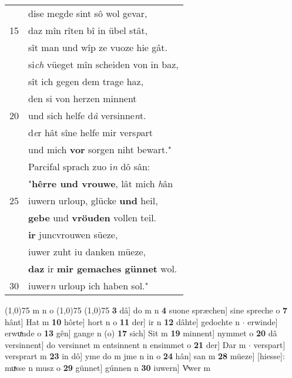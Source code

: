 \documentclass[8pt,a4paper,notitlepage]{article}
\begin{document}
\begin{table}[ht]
\begin{minipage}[t]{0.5\linewidth}
\begin{tabular}{rl}
 & dise megde sint sô wol gevar,\\ 
15 & daz mîn rîten bî in übel stât,\\ 
 & sît man und wîp ze vuoze hie gât.\\ 
 & si\textit{ch} vüeget mîn scheiden von in baz,\\ 
 & sît ich gegen dem trage haz,\\ 
 & den si von herzen minnent\\ 
20 & und sich helfe d\textit{â} versinne\textit{n}t.\\ 
 & d\textit{e}r hât sîne helfe mir vers\textit{p}art\\ 
 & und mich \textbf{vor} sorgen niht bewart."\\ 
 & Parcifal sprach zuo i\textit{n} dô sân:\\ 
 & "\textbf{hêrre und vrouwe}, lât mich \textit{h}ân\\ 
25 & iuwern urloup, glücke \textbf{und} heil,\\ 
 & \textbf{gebe} und \textbf{vröuden} vollen teil.\\ 
 & \textbf{ir} juncvrouwen süeze,\\ 
 & iuwer zuht iu danken müeze,\\ 
 & \textbf{daz} ir \textbf{mir gemaches günnet} wol.\\ 
30 & iuwer\textit{n} urloup ich haben sol."\\ 
\end{tabular}
\scriptsize
\line(1,0){75} \newline
m n o \newline
\line(1,0){75} \newline
\newline
\line(1,0){75} \newline
\textbf{3} dâ] do m n \textbf{4} suone spræchen] sine spreche o \textbf{7} hânt] Hat m \textbf{10} hôrte] hort n o \textbf{11} der] ir n \textbf{12} dâhte] gedochte n  $\cdot$ erwinde] erwuͯnde o \textbf{13} gên] gange n (o) \textbf{17} sich] Sit m \textbf{19} minnent] nymmet o \textbf{20} dâ versinnent] do versinnet m entsinnent n ensimmet o \textbf{21} der] Dar m  $\cdot$ verspart] versprart m \textbf{23} in dô] yme do m jme n in o \textbf{24} hân] san m \textbf{28} müeze] [hiesse]: muͯsse n musz o \textbf{29} günnet] gúnnen n \textbf{30} iuwern] Vͯwer m \newline
\end{minipage}
\end{table}
\newpage
\end{document}
